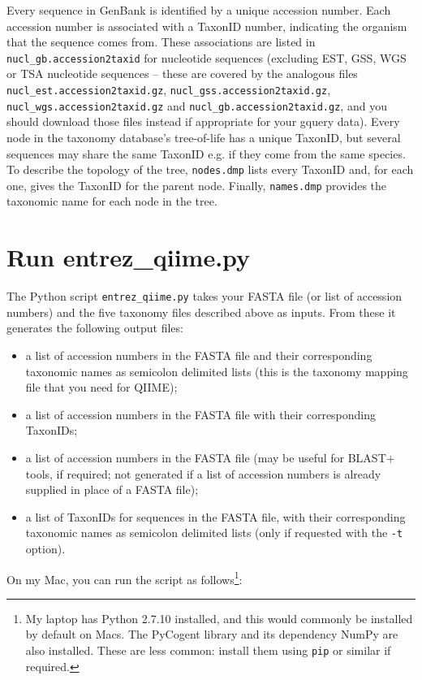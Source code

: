 \documentclass[11pt]{amsart}
\begin{document}
Every sequence in GenBank is identified by a unique accession number. Each accession number is associated with a TaxonID number, indicating the organism that the sequence comes from. These associations are listed in \verb|nucl_gb.accession2taxid| for nucleotide sequences (excluding EST, GSS, WGS or TSA nucleotide sequences -- these are covered by the analogous files \verb|nucl_est.accession2taxid.gz|, \verb|nucl_gss.accession2taxid.gz|, \verb|nucl_wgs.accession2taxid.gz| and \verb|nucl_gb.accession2taxid.gz|, and you should download those files instead if appropriate for your gquery data). Every node in the taxonomy database's tree-of-life has a unique TaxonID, but several sequences may share the same TaxonID e.g. if they come from the same species. To describe the topology of the tree, \verb|nodes.dmp| lists every TaxonID and, for each one, gives the TaxonID for the parent node. Finally, \verb|names.dmp| provides the taxonomic name for each node in the tree.

\section{Run entrez\_qiime.py}
\label{section:python}

The Python script \verb|entrez_qiime.py| takes your FASTA file (or list of accession numbers) and the five taxonomy files described above as inputs. From these it generates the following output files:
\begin{itemize}
	\item a list of accession numbers in the FASTA file and their corresponding taxonomic names as semicolon delimited lists (this is the taxonomy mapping file that you need for QIIME);
	\item a list of accession numbers in the FASTA file with their corresponding TaxonIDs;
	\item a list of accession numbers in the FASTA file (may be useful for BLAST+ tools, if required; not generated if a list of accession numbers is already supplied in place of a FASTA file);
	\item a list of TaxonIDs for sequences in the FASTA file, with their corresponding taxonomic names as semicolon delimited lists (only if requested with the \verb|-t| option).
\end{itemize}

On my Mac, you can run the script as follows\footnote{My laptop has Python 2.7.10 installed, and this would commonly be installed by default on Macs. The PyCogent library and its dependency NumPy are also installed. These are less common: install them using \texttt{pip} or similar if required.}:
\end{document}
